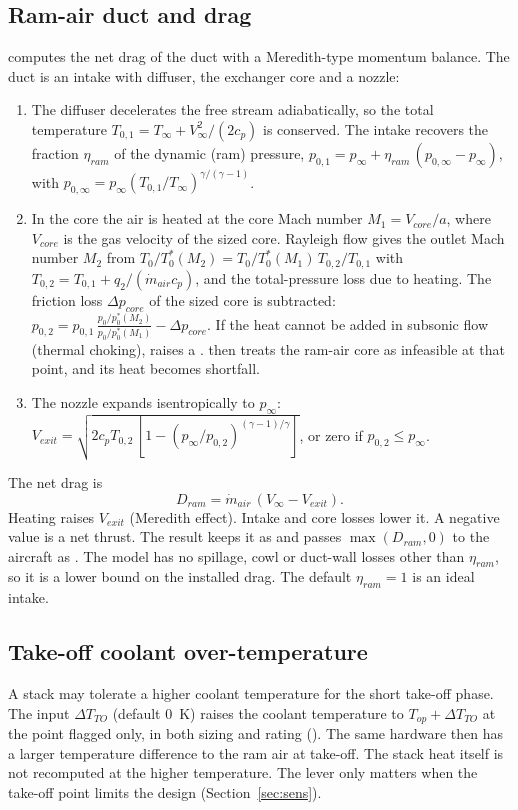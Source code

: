\documentclass[a4paper,11pt]{article}
\begin{document}
\subsection{Ram-air duct and drag}\label{sec:ramair}
 computes the net drag of the duct with a Meredith-type
momentum balance. The duct is an intake with diffuser, the exchanger core and a nozzle:
\begin{enumerate}
\item The diffuser decelerates the free stream adiabatically, so the total temperature
  $T_{0,1} = T_\infty + V_\infty^2/(2c_p)$ is conserved. The intake recovers the fraction
  $\eta_{ram}$ of the dynamic (ram) pressure,
  $p_{0,1} = p_\infty + \eta_{ram}\,(p_{0,\infty} - p_\infty)$, with
  $p_{0,\infty} = p_\infty (T_{0,1}/T_\infty)^{\gamma/(\gamma-1)}$.
\item In the core the air is heated at the core Mach number $M_1 = V_{core}/a$, where
  $V_{core}$ is the gas velocity of the sized core. Rayleigh flow gives the outlet Mach
  number $M_2$ from $T_0/T_0^*(M_2) = T_0/T_0^*(M_1)\,T_{0,2}/T_{0,1}$ with
  $T_{0,2} = T_{0,1} + q_2/(\dot m_{air} c_p)$, and the total-pressure loss due to heating.
  The friction loss $\Delta p_{core}$ of the sized core is subtracted:
  $p_{0,2} = p_{0,1}\,\frac{p_0/p_0^*(M_2)}{p_0/p_0^*(M_1)} - \Delta p_{core}$. If the
  heat cannot be added in subsonic flow (thermal choking),  raises a
  .  then treats the ram-air core as infeasible at that
  point, and its heat becomes shortfall.
\item The nozzle expands isentropically to $p_\infty$:
  $V_{exit} = \sqrt{2c_p T_{0,2}\,[1 - (p_\infty/p_{0,2})^{(\gamma-1)/\gamma}]}$, or zero if
  $p_{0,2} \le p_\infty$.
\end{enumerate}
The net drag is
\begin{equation}
  D_{ram} = \dot m_{air}\,(V_\infty - V_{exit}).
  \label{eq:dram}
\end{equation}
Heating raises $V_{exit}$ (Meredith effect). Intake and core losses lower it. A negative
value is a net thrust. The result keeps it as  and passes
$\max(D_{ram}, 0)$ to the aircraft as . The model has no spillage, cowl or
duct-wall losses other than $\eta_{ram}$, so it is a lower bound on the installed drag. The
default $\eta_{ram} = 1$ is an ideal intake.

\subsection{Take-off coolant over-temperature}\label{sec:overtemp}
A stack may tolerate a higher coolant temperature for the short take-off phase. The input
 $\Delta T_{TO}$ (default \SI{0}{K}) raises the coolant
temperature to $T_{op} + \Delta T_{TO}$ at the point flagged  only, in both
sizing and rating (). The same hardware then has a larger temperature
difference to the ram air at take-off. The stack heat itself is not recomputed at the higher
temperature. The lever only matters when the take-off point limits the design
(Section~\ref{sec:sens}).
\end{document}
